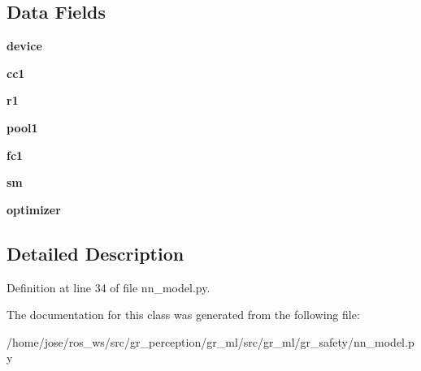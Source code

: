 \subsection*{Data Fields}
\begin{DoxyCompactItemize}
\item 
\mbox{\label{classgr__ml_1_1gr__safety_1_1nn__model_1_1TerrainNetworkModel_a26e5aa854e2b90a68fb245bb66b2e825}} 
{\bfseries device}
\item 
\mbox{\label{classgr__ml_1_1gr__safety_1_1nn__model_1_1TerrainNetworkModel_a6680584f9ff5be591989f7530dcde152}} 
{\bfseries cc1}
\item 
\mbox{\label{classgr__ml_1_1gr__safety_1_1nn__model_1_1TerrainNetworkModel_afeb318c0910b64db651c0c3fa3002de8}} 
{\bfseries r1}
\item 
\mbox{\label{classgr__ml_1_1gr__safety_1_1nn__model_1_1TerrainNetworkModel_adba04c4da60221db83dc59f17de8930e}} 
{\bfseries pool1}
\item 
\mbox{\label{classgr__ml_1_1gr__safety_1_1nn__model_1_1TerrainNetworkModel_a88ea33c855c50dfd17e7cec649c53ada}} 
{\bfseries fc1}
\item 
\mbox{\label{classgr__ml_1_1gr__safety_1_1nn__model_1_1TerrainNetworkModel_a24b8b51d07b3fd272204ab3ffdb3e798}} 
{\bfseries sm}
\item 
\mbox{\label{classgr__ml_1_1gr__safety_1_1nn__model_1_1TerrainNetworkModel_a073c99e53b91536c47e66af296cbf339}} 
{\bfseries optimizer}
\end{DoxyCompactItemize}


\subsection{Detailed Description}


Definition at line 34 of file nn\+\_\+model.\+py.



The documentation for this class was generated from the following file\+:\begin{DoxyCompactItemize}
\item 
/home/jose/ros\+\_\+ws/src/gr\+\_\+perception/gr\+\_\+ml/src/gr\+\_\+ml/gr\+\_\+safety/nn\+\_\+model.\+py\end{DoxyCompactItemize}

